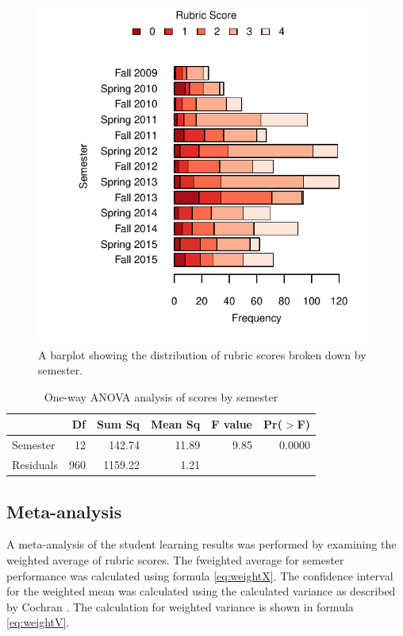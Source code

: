 \documentclass[fleqn,10pt]{SelfArx}\usepackage[]{graphicx}\usepackage[]{color}
\begin{document}
\begin{figure}[h]\centering

\includegraphics[width=\columnwidth,viewport = 30 0 288 288]{./figure/barplot}
\protect\caption{A barplot showing the distribution of rubric scores broken down by semester.}
\label{fig:barplot}
\end{figure}

\begin{center}
\begin{table}[ht]
\centering
\caption{One-way ANOVA analysis of scores by semester} 
\label{tab:anova}
\begin{tabular}{lrrrrr}
  \hline
 & Df & Sum Sq & Mean Sq & F value & Pr($>$F) \\ 
  \hline
Semester & 12 & 142.74 & 11.89 & 9.85 & 0.0000 \\ 
  Residuals & 960 & 1159.22 & 1.21 &  &  \\ 
   \hline
\end{tabular}
\end{table}

\end{center}

\lipsum[1]
\subsection{Meta-analysis}
A meta-analysis of the student learning results was performed by examining the weighted average of rubric scores. The fweighted average for semester performance was calculated using formula \ref{eq:weightX}. The confidence interval for the weighted mean was calculated using the calculated variance as described by Cochran \citep{Cochran1977}. The calculation for weighted variance is shown in formula \ref{eq:weightV}.
\end{document}
